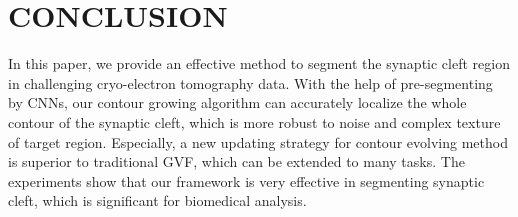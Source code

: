 \documentclass{article}
\begin{document}
\section{CONCLUSION}
\label{sec:conclusion}
In this paper, we provide an effective method to segment the synaptic cleft region in challenging cryo-electron tomography data.
With the help of pre-segmenting by CNNs, our contour growing algorithm can accurately localize the whole contour of the synaptic cleft, which is more robust to noise and complex texture of target region.
Especially, a new updating strategy for contour evolving method is superior to traditional GVF, which can be extended to many tasks.
The experiments show that our framework is very effective in segmenting synaptic cleft, which is significant for biomedical analysis.

%
%


\end{document}
